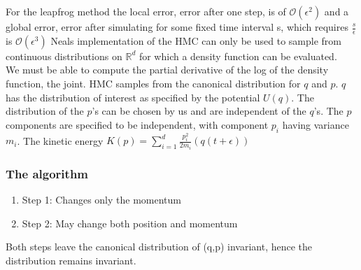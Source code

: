 \documentclass[twoside]{article}
\begin{document}
For the leapfrog method the local error, error after one step, is of $\mathcal{O}(\epsilon^{2})$ and a global error, error after simulating for some fixed time interval s, which requires $\frac{s}{\epsilon}$ is $\mathcal{O}(\epsilon^{3})$
Neals implementation of the HMC can only be used to sample from continuous distributions on $\mathbb{R}^{d}$ for which a density function can be evaluated.\\
We must be able to compute the partial derivative of the log of the density function, the joint. 
HMC samples from the canonical distribution for $q$ and $p$. $q$ has the distribution of interest as specified by the potential $U(q)$. 
The distribution of the $p$'s can be chosen by us and are independent of the $q$'s. 
The $p$ components are specified to be independent, with component $p_{i}$ having variance $m_{i}$.
The kinetic energy $K(p) = \sum_{i =1}^{d}\frac{p_{i}^{2}}{2m_{i}}(q(t + \epsilon))
$

\subsubsection{The algorithm}

\begin{enumerate}
	\item Step 1: Changes only the momentum
	\item Step 2: May change both position and momentum
\end{enumerate}
Both steps leave the canonical distribution of (q,p) invariant, hence the distribution remains invariant.
\end{document}
